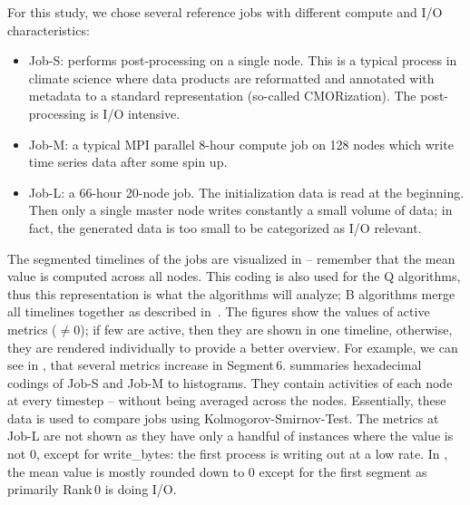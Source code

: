 \documentclass{jhps}
\begin{document}
For this study, we chose several reference jobs with different compute and I/O characteristics:
\begin{itemize}
	\item Job-S: performs post-processing on a single node. This is a typical process in climate science where data products are reformatted and annotated with metadata to a standard representation (so-called CMORization). The post-processing is I/O intensive.
  \item Job-M: a typical MPI parallel 8-hour compute job on 128 nodes which write time series data after some spin up.   %
	\item Job-L: a 66-hour 20-node job.
  The initialization data is read at the beginning.
  Then only a single master node writes constantly a small volume of data; in fact, the generated data is too small to be categorized as I/O relevant.
\end{itemize}

The segmented timelines of the jobs are visualized in  -- remember that the mean value is computed across all nodes.
This coding is also used for the Q algorithms, thus this representation is what the algorithms will analyze; B algorithms merge all timelines together as described in~\cite{Eugen20HPS}.
The figures show the values of active metrics ($\neq 0$); if few are active, then they are shown in one timeline, otherwise, they are rendered individually to provide a better overview.
For example, we can see in , that several metrics increase in Segment\,6.
 summaries hexadecimal codings of Job-S and Job-M to histograms.
They contain activities of each node at every timestep -- without being averaged across the nodes.
Essentially, these data is used to compare jobs using Kolmogorov-Smirnov-Test.
The metrics at Job-L are not shown as they have only a handful of instances where the value is not 0, except for write\_bytes: the first process is writing out at a low rate.
In , the mean value is mostly rounded down to 0 except for the first segment as primarily Rank\,0 is doing I/O.
\end{document}
